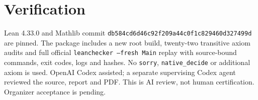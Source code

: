 \documentclass[11pt]{article}
\begin{document}
\section{Verification}
Lean 4.33.0 and Mathlib commit
\texttt{db584cd6d46c92f209a44c0f1c829460d327499d} are pinned.
The package includes a new root build, twenty-two transitive axiom audits
and full official \texttt{leanchecker --fresh Main} replay with
source-bound commands, exit codes, logs and hashes. No \texttt{sorry},
\texttt{native\_decide} or additional axiom is used. OpenAI Codex
assisted; a separate supervising Codex agent reviewed the source,
report and PDF. This is AI review, not human certification.
Organizer acceptance is pending.
\end{document}
